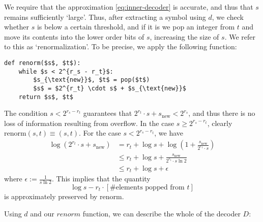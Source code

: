 \documentclass{article}
\begin{document}
We require that the approximation \cref{eq:inner-decoder} is accurate, and thus
that $s$ remains sufficiently `large'. Thus, after extracting a symbol using
$d$, we check whether $s$ is below a certain threshold, and if it is we pop an
integer from $t$ and move its contents into the lower order bits of $s$,
increasing the size of $s$. We refer to this as `renormalization'.  To be
precise, we apply the following function:

\begin{lstlisting}
def renorm($s$, $t$):
    while $s < 2^{r_s - r_t}$:
        $s_{\text{new}}$, $t$ = pop($t$)
        $s$ = $2^{r_t} \cdot s$ + $s_{\text{new}}$
    return $s$, $t$
\end{lstlisting}

The condition $s < 2^{r_s - r_t}$ guarantees that $2^{r_t} \cdot s +
s_{\text{new}} < 2^{r_s}$, and thus there is no loss of information resulting
from overflow. In the case $s \geq 2^{r_s - r_t}$, clearly $\text{renorm}(s, t)
\equiv (s, t)$. For the case $s < 2^{r_s - r_t}$, we have
\begin{align}
        \log (2^{r_t} \cdot s + s_\text{new})
        &= r_t + \log s + \log\left(1 + \frac{s_\text{new}}{2^{r_t} \cdot
                s}\right)\\
        &\leq r_t + \log s + \frac{s_\text{new}}{2^{r_t} \cdot s\ln 2}\\
        &\leq r_t + \log s + \epsilon
\end{align}
where $\epsilon := \frac{1}{s\ln 2}$. This implies that the quantity
\begin{equation}
\log s - r_t\cdot\left[\text{\# elements popped from $t$}\right]
\end{equation}
is approximately preserved by renorm.

Using $d$ and our $renorm$ function, we can describe the whole of the decoder
$D$:
\end{document}

